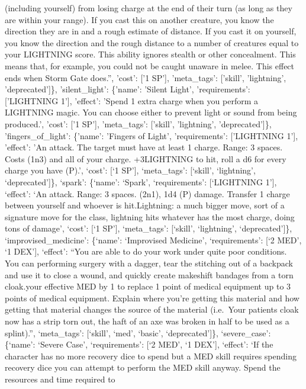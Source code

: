 \documentclass[
  letterpaper,
  DIV=11,
  numbers=noendperiod]{scrartcl}
\begin{document}
{(including yourself) from losing charge at the end of their turn (as
long as they are within your range). If you cast this on another
creature, you know the direction they are in and a rough estimate of
distance. If you cast it on yourself, you know the direction and the
rough distance to a number of creatures equal to your LIGHTNING score.
This ability ignores stealth or other concealment. This means that, for
example, you could not be caught unaware in melee. This effect ends when
Storm Gate does.'', 'cost': {[}'1 SP'{]}, 'meta\_tags': {[}'skill',
'lightning', 'deprecated'{]}\}, 'silent\_light': \{'name': 'Silent
Light', 'requirements': {[}'LIGHTNING 1'{]}, 'effect': 'Spend 1 extra
charge when you perform a LIGHTNING magic. You can choose either to
prevent light or sound from being produced.', 'cost': {[}'1 SP'{]},
'meta\_tags': {[}'skill', 'lightning', 'deprecated'{]}\},
'fingers\_of\_light': \{'name': 'Fingers of Light', 'requirements':
{[}'LIGHTNING 1'{]}, 'effect': 'An attack. The target must have at least
1 charge. Range: 3 spaces. Costs (1n3) and all of your charge.
\n+3}LIGHTNING to hit, roll a d6 for every charge you have (P).',
`cost': {[}`1 SP'{]}, `meta\_tags': {[}`skill', `lightning',
`deprecated'{]}\}, `spark': \{`name': `Spark', `requirements':
{[}`LIGHTNING 1'{]}, `effect': `An attack. Range: 3 spaces. (2n1), 1d4
(P) damage. Transfer 1 charge between yourself and whoever is
hit.\nCall Lightning: a much bigger move, sort of a signature move for
the class, lightning hits whatever has the most charge, doing tons of
damage', `cost': {[}`1 SP'{]}, `meta\_tags': {[}`skill', `lightning',
`deprecated'{]}\}, `improvised\_medicine': \{`name': `Improvised
Medicine', `requirements': {[}`2 MED', `1 DEX'{]}, `effect': ``You are
able to do your work under quite poor conditions. You can performing
surgery with a dagger, tear the stitching out of a backpack and use it
to close a wound, and quickly create makeshift bandages from a torn
cloak.\nLower your effective MED by 1 to replace 1 point of medical
equipment up to 3 points of medical equipment. Explain where you're
getting this material and how getting that material changes the source
of the material (i.e.~Your patients cloak now has a strip torn out, the
haft of an axe was broken in half to be used as a splint).'',
`meta\_tags': {[}`skill', `med', `basic', `deprecated'{]}\},
`severe\_case': \{`name': `Severe Case', `requirements': {[}`2 MED', `1
DEX'{]}, `effect': `If the character has no more recovery dice to spend
but a MED skill requires spending recovery dice you can attempt to
perform the MED skill anyway. Spend the resources and time required to
\end{document}
